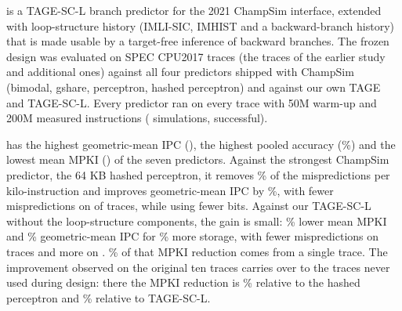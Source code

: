 \prop{} is a TAGE-SC-L branch predictor for the 2021 ChampSim interface, extended with loop-structure history (IMLI-SIC, IMHIST and a backward-branch history) that is made usable by a target-free inference of backward branches. The frozen design was evaluated on  SPEC CPU2017 traces (the  traces of the earlier study and  additional ones) against all four predictors shipped with ChampSim (bimodal, gshare, perceptron, hashed perceptron) and against our own TAGE and TAGE-SC-L. Every predictor ran on every trace with 50M warm-up and 200M measured instructions ( simulations,  successful).

\prop{} has the highest geometric-mean IPC (), the highest pooled accuracy (\%) and the lowest mean MPKI () of the seven predictors. Against the strongest ChampSim predictor, the 64 KB hashed perceptron, it removes \% of the mispredictions per kilo-instruction and improves geometric-mean IPC by \%, with fewer mispredictions on  of  traces, while using  fewer bits. Against our TAGE-SC-L without the loop-structure components, the gain is small: \% lower mean MPKI and \% geometric-mean IPC for \% more storage, with fewer mispredictions on  traces and more on . \% of that MPKI reduction comes from a single trace. The improvement observed on the original ten traces carries over to the  traces never used during design: there the MPKI reduction is \% relative to the hashed perceptron and \% relative to TAGE-SC-L.
